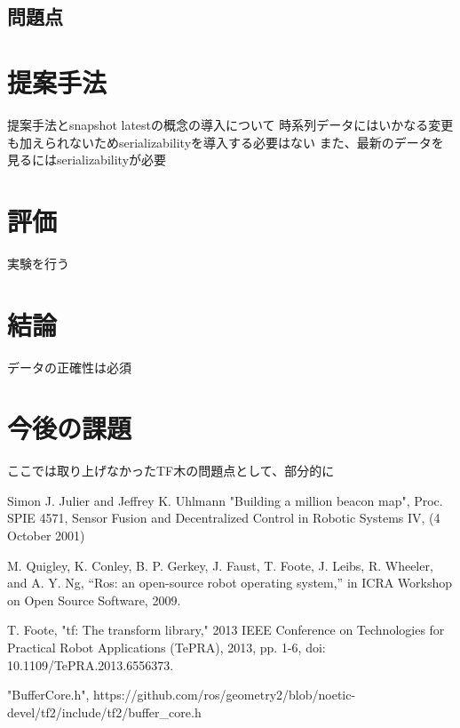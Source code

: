 \documentclass{article}
\begin{document}
\begin{multicols}{2}
\subsection{問題点}

\section{提案手法}

提案手法とsnapshot latestの概念の導入について
時系列データにはいかなる変更も加えられないためserializabilityを導入する必要はない
また、最新のデータを見るにはserializabilityが必要

\section{評価}
実験を行う

\section{結論}

データの正確性は必須

\section{今後の課題}

ここでは取り上げなかったTF木の問題点として、部分的に

	
\begin{thebibliography}{99}

 Simon J. Julier and Jeffrey K. Uhlmann "Building a million beacon map", Proc. SPIE 4571, Sensor Fusion and Decentralized Control in Robotic Systems IV, (4 October 2001)

 M. Quigley, K. Conley, B. P. Gerkey, J. Faust, T. Foote, J. Leibs, R. Wheeler, and A. Y. Ng, “Ros: an open-source robot operating system,” in ICRA Workshop on Open Source Software, 2009.

 T. Foote, "tf: The transform library," 2013 IEEE Conference on Technologies for Practical Robot Applications (TePRA), 2013, pp. 1-6, doi: 10.1109/TePRA.2013.6556373.

 "BufferCore.h", https://github.com/ros/geometry2/blob/noetic-devel/tf2/include/tf2/buffer\_core.h

\end{thebibliography}
	
\end{multicols}	
\end{document}

